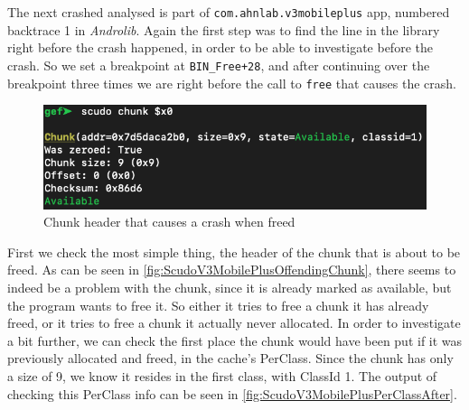 \documentclass[a4paper,11pt,oneside]{report}
\begin{document}
The next crashed analysed is part of \verb|com.ahnlab.v3mobileplus| app,
numbered backtrace 1 in \textit{Androlib}. Again the first step was to find
the line in the library right before the crash happened, in order to be able
to investigate before the crash. So we set a breakpoint at \verb|BIN_Free+28|,
and after continuing over the breakpoint three times we are right before the
call to \verb|free| that causes the crash.

\begin{figure}[h!]
  \centering
  \includegraphics[width=\linewidth]{figures/ScudoV3MobilePlusOffendingChunk.png}
  \caption{Chunk header that causes a crash when freed}
  \label{fig:ScudoV3MobilePlusOffendingChunk}
\end{figure}

First we check the most simple thing, the header of the chunk that is about
to be freed. As can be seen in \autoref{fig:ScudoV3MobilePlusOffendingChunk},
there seems to indeed be a problem with the chunk, since it is already marked
as available, but the program wants to free it. So either it tries to free a
chunk it has already freed, or it tries to free a chunk it actually never
allocated. In order to investigate a bit further, we can check the first place
the chunk would have been put if it was previously allocated and freed, in the
cache's PerClass. Since the chunk has only a size of 9, we know it resides in
the first class, with ClassId 1. The output of checking this PerClass info can
be seen in \autoref{fig:ScudoV3MobilePlusPerClassAfter}.
\end{document}
